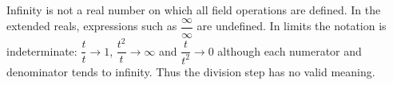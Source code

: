 Infinity is not a real number on which all field operations are defined. In the extended reals, expressions such as $\dfrac{\infty}{\infty}$ are undefined. In limits the notation is indeterminate: $\dfrac{t}{t}\to1$, $\dfrac{t^2}{t}\to\infty$ and $\dfrac{t}{t^2}\to0$ although each numerator and denominator tends to infinity. Thus the division step has no valid meaning.
